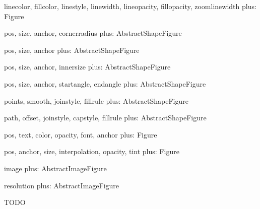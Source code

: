         linecolor, fillcolor, linestyle, linewidth, lineopacity, fillopacity, zoomlinewidth
        plus: Figure

        pos, size, anchor, cornerradius
        plus: AbstractShapeFigure

        pos, size, anchor
        plus: AbstractShapeFigure

        pos, size, anchor, innersize
        plus: AbstractShapeFigure

        pos, size, anchor, startangle, endangle
        plus: AbstractShapeFigure

        points, smooth, joinstyle, fillrule
        plus: AbstractShapeFigure

        path, offset, joinstyle, capstyle, fillrule
        plus: AbstractShapeFigure

        pos, text, color, opacity, font, anchor
        plus: Figure

        pos, anchor, size, interpolation, opacity, tint
        plus: Figure

        image
        plus: AbstractImageFigure

        resolution
        plus: AbstractImageFigure

TODO


